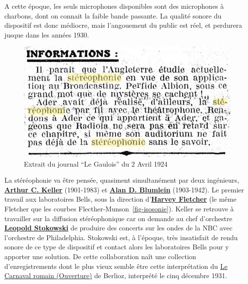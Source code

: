 \documentclass[
  letterpaper,
  DIV=11,
  numbers=noendperiod]{scrreprt}
\begin{document}
A cette époque, les seuls microphones disponibles sont des microphones à
charbons, dont on connait la faible bande passante. La qualité sonore du
dispositif est donc médiocre, mais l'angouement du public est réel, et
perdurera jusque dans les années 1930.

\begin{figure}

{\centering \includegraphics{spatialisation/../_resources/bitmap/various/leGaulois2Avril1924.png}

}

\caption{Extrait du journal ``Le Gaulois'' du 2 Avril 1924}

\end{figure}

La stéréophonie va être pensée, quasiment simultanément par deux
ingénieurs,
\textbf{\href{https://en.wikipedia.org/wiki/Arthur_C._Keller}{Arthur C.
Keller}} (1901-1983) et
\textbf{\href{https://en.wikipedia.org/wiki/Alan_Blumlein}{Alan D.
Blumlein}} (1903-1942). Le premier travail aux laboratoires Bells, sous
la direction
d'\textbf{\href{http://www.byhigh.org/History/Fletcher/DrHarvey.html}{Harvey
Fletcher}} (le même Fletcher que les courbes
Flecther-Munson~\ref{fig-isosonie}). Keller se retrouve à travailler sur
la diffusion stéréophonique car on demande au chef d'orchestre
\textbf{\href{https://en.wikipedia.org/wiki/Leopold_Stokowski}{Leopold
Stokowski}} de produire des concerts sur les ondes de la NBC avec
l'orchestre de Philadelphia. Stokowski est, à l'époque, très insatisfait
de rendu sonore de ce type de dispositif et contact alors les
laboratoires Bells pour y apporter une solution. De cette collaboration
naît une collection d'enregistrements dont le plus vieux semble être
cette interprétation du
\href{https://www.stokowski.org/sitebuilderfiles/311201_Roman_Carnival_MA.mp3}{Le
Carnaval romain (Ouverture)} de Berlioz, interprété le cinq décembre
1931.
\end{document}
